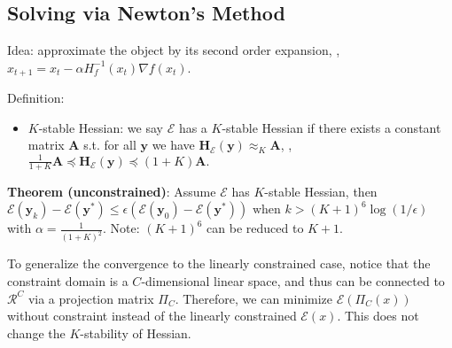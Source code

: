 \subsection{Solving via Newton's Method}

Idea: approximate the object by its second order expansion, \ie, $x_{t+1} = x_t - \alpha H_f^{-1}(x_t) \nabla f(x_t)$.

Definition:
\begin{itemize}
    \item $K$-stable Hessian: we say $\mathcal{E}$ has a $K$-stable Hessian if there exists a constant matrix $\boldsymbol{A}$ s.t. for all $\boldsymbol{y}$ we have
    $
    \boldsymbol{H}_{\mathcal{E}}(\boldsymbol{y}) \approx_{K} \boldsymbol{A}$, \ie, $ \frac{1}{1+K} \boldsymbol{A} \preceq \boldsymbol{H}_{\mathcal{E}}(\boldsymbol{y}) \preceq(1+K) \boldsymbol{A} .
    $
\end{itemize}

\textbf{Theorem (unconstrained)}: Assume $\mathcal{E}$ has $K$-stable Hessian, then $\mathcal{E}\left(\boldsymbol{y}_{k}\right)-\mathcal{E}\left(\boldsymbol{y}^{*}\right) \leq \epsilon\left(\mathcal{E}\left(\boldsymbol{y}_{0}\right)-\mathcal{E}\left(\boldsymbol{y}^{*}\right)\right) \text { when } k>(K+1)^{6} \log (1 / \epsilon)$ with $\alpha = \frac{1}{(1+K)^2}$. Note: $(K+1)^6$ can be reduced to $K+1$.

To generalize the convergence to the linearly constrained case, notice that the constraint domain is a $C$-dimensional linear space, and thus can be connected to $\mathcal{R}^C$ via a projection matrix $\Pi_C$. Therefore, we can minimize $\mathcal{E}(\Pi_C(x))$ without constraint instead of the linearly constrained $\mathcal{E}(x)$. This does not change the $K$-stability of Hessian.